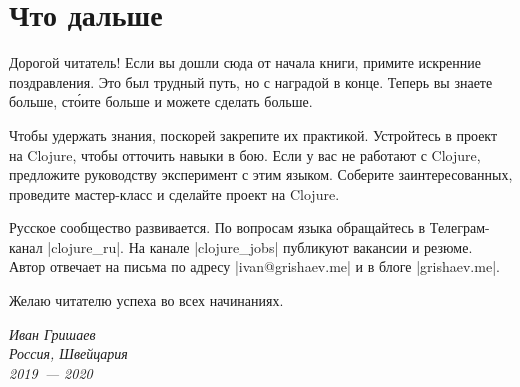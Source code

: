 \chapter{Что дальше}

Дорогой читатель! Если вы дошли сюда от начала книги, примите искренние
поздравления. Это был трудный путь, но с наградой в конце. Теперь вы знаете
больше, ст\'{о}ите больше и можете сделать больше.

Чтобы удержать знания, поскорей закрепите их практикой. Устройтесь в проект на
Clojure, чтобы отточить навыки в бою. Если у вас не работают с Clojure,
предложите руководству эксперимент с этим языком. Соберите заинтересованных,
проведите мастер-класс и сделайте проект на Clojure.

Русское сообщество развивается. По вопросам языка обращайтесь в Телеграм-канал
\spverb|clojure_ru|. На канале \spverb|clojure_jobs| публикуют вакансии и
резюме. Автор отвечает на письма по адресу \spverb|ivan@grishaev.me| и в блоге
\spverb|grishaev.me|.

Желаю читателю успеха во всех начинаниях.

\vspace{1em}

\noindent
\textit{Иван Гришаев\\Россия, Швейцария\\2019~--- 2020}
